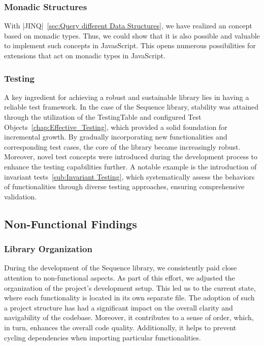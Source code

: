 \subsubsection{Monadic Structures}
\label{subsub:Monadic Structures}
With |JINQ|~\ref{sec:Query different Data Structures}, we have realized an
concept based on monadic types. Thus, we could show that it is also
possible and valuable to implement such concepts in JavasScript.
This opens numerous possibilities for extensions that act on monadic types in
JavaScript.

\subsubsection{Testing}
\label{subsub:Testing}
A key ingredient for achieving a robust and sustainable library lies in having
a reliable test framework. In the case of the Sequence library, stability was
attained through the utilization of the TestingTable and configured Test
Objects~\ref{chap:Effective_Testing}, which provided a solid foundation for incremental growth.
By gradually incorporating new functionalities and corresponding test cases,
the core of the library became increasingly robust. Moreover, novel test
concepts were introduced during the development process to enhance the testing
capabilities further. A notable example is the introduction of invariant tests~\ref{sub:Invariant Testing},
which systematically assess the behaviors of functionalities through
diverse testing approaches, ensuring comprehensive validation.

\subsection{Non-Functional Findings}
\label{sub:Non-Functional Aspects}

\subsubsection{Library Organization}
\label{subsub:Library Organisation}
During the development of the Sequence library, we consistently paid close
attention to non-functional aspects. As part of this effort, we adjusted the
organization of the project's development setup. This led us to the current
state, where each functionality is located in its own separate file. The
adoption of such a project structure has had a significant impact on the
overall clarity and navigability of the codebase. Moreover, it contributes to a
sense of order, which, in turn, enhances the overall code quality.
Additionally, it helps to prevent cycling dependencies when importing
particular functionalities.

